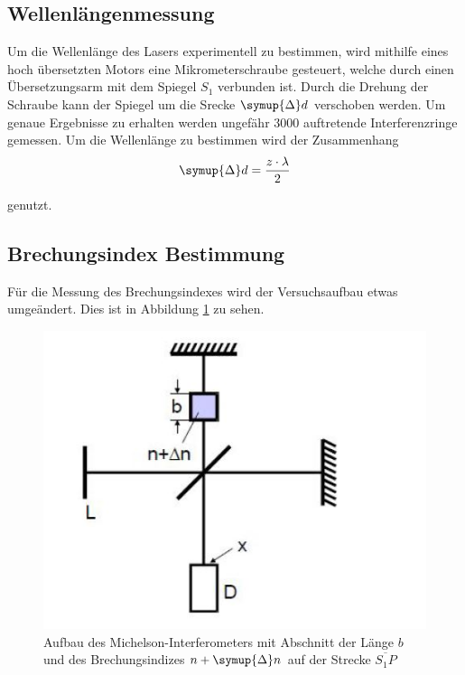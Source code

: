 \subsection{Wellenlängenmessung}
Um die Wellenlänge des Lasers experimentell zu bestimmen, wird mithilfe eines hoch übersetzten Motors eine Mikrometerschraube gesteuert, welche durch einen Übersetzungsarm mit dem 
Spiegel $S_1$ verbunden ist. Durch die Drehung der Schraube kann der Spiegel um die Srecke $\symup{\Delta} d$ verschoben werden. Um genaue Ergebnisse zu erhalten werden ungefähr 
3000 auftretende Interferenzringe gemessen. 
Um die Wellenlänge zu bestimmen wird der Zusammenhang
\begin{equation}
    \symup{\Delta}d = \frac{z \cdot \lambda}{2}
    \label{eqn:d1}
\end{equation}

\noindent
genutzt. 

\subsection{Brechungsindex Bestimmung}
Für die Messung des Brechungsindexes wird der Versuchsaufbau etwas umgeändert. Dies ist in Abbildung \ref{fig:2} zu sehen.

\begin{figure}
    \centering
    \includegraphics[scale = 0.7]{Picture/Pic2.JPG}
    \caption{Aufbau des Michelson-Interferometers mit Abschnitt der Länge $b$ und des
    Brechungsindizes $n + \symup{\Delta}n$ auf der Strecke $\overline{S_1 P}$ \cite{V401}}
    \label{fig:2}
  \end{figure}

